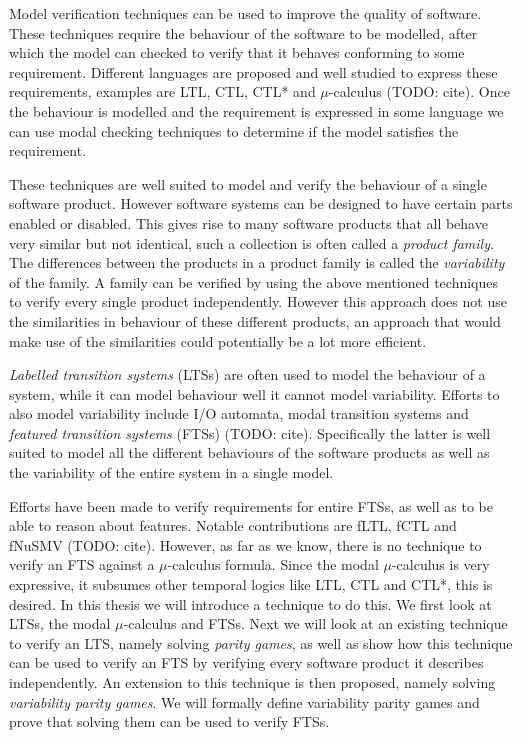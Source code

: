 Model verification techniques can be used to improve the quality of software. These techniques require the behaviour of the software to be modelled, after which the model can checked to verify that it behaves conforming to some requirement. Different languages are proposed and well studied to express these requirements, examples are LTL, CTL, CTL* and $\mu$-calculus (TODO: cite). Once the behaviour is modelled and the requirement is expressed in some language we can use modal checking techniques to determine if the model satisfies the requirement.

These techniques are well suited to model and verify the behaviour of a single software product. However software systems can be designed to have certain parts enabled or disabled. This gives rise to many software products that all behave very similar but not identical, such a collection is often called a \textit{product family}. The differences between the products in a product family is called the \textit{variability} of the family. A family can be verified by using the above mentioned techniques to verify every single product independently. However this approach does not use the similarities in behaviour of these different products, an approach that would make use of the similarities could potentially be a lot more efficient.

\textit{Labelled transition systems} (LTSs) are often used to model the behaviour of a system, while it can model behaviour well it cannot model variability. Efforts to also model variability include I/O automata, modal transition systems and \textit{featured transition systems} (FTSs) (TODO: cite). Specifically the latter is well suited to model all the different behaviours of the software products as well as the variability of the entire system in a single model.

Efforts have been made to verify requirements for entire FTSs, as well as to be able to reason about features. Notable contributions are fLTL, fCTL and fNuSMV (TODO: cite). However, as far as we know, there is no technique to verify an FTS against a $\mu$-calculus formula. Since the modal $\mu$-calculus is very expressive, it subsumes other temporal logics like LTL, CTL and CTL*, this is desired. In this thesis we will introduce a technique to do this. We first look at LTSs, the modal $\mu$-calculus and FTSs. Next we will look at an existing technique to verify an LTS, namely solving \textit{parity games}, as well as show how this technique can be used to verify an FTS by verifying every software product it describes independently. An extension to this technique is then proposed, namely solving \textit{variability parity games}. We will formally define variability parity games and prove that solving them can be used to verify FTSs.